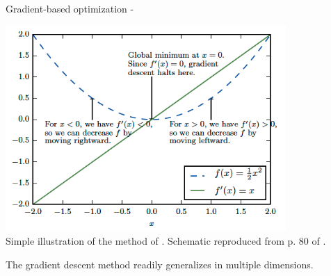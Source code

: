 \begin{frame}[t,allowframebreaks]{Gradient-based optimization -}
    \framebreak


    \vspace{-1.0cm}

    \begin{center}
        \includegraphics[width=0.80\textwidth]
            {./images/grad_descent/goodfellow17_grad_descent_1d.png}\\
        {\tiny 
            Simple illustration of the method of
            .
            \color{col:attribution} 
            Schematic reproduced from p. 80 of \cite{Goodfellow:2017MITDL}.\\
        }
    \end{center}        

    \framebreak


    The \gls{gradient descent} method
    readily generalizes in multiple dimensions.\\



\end{frame}
